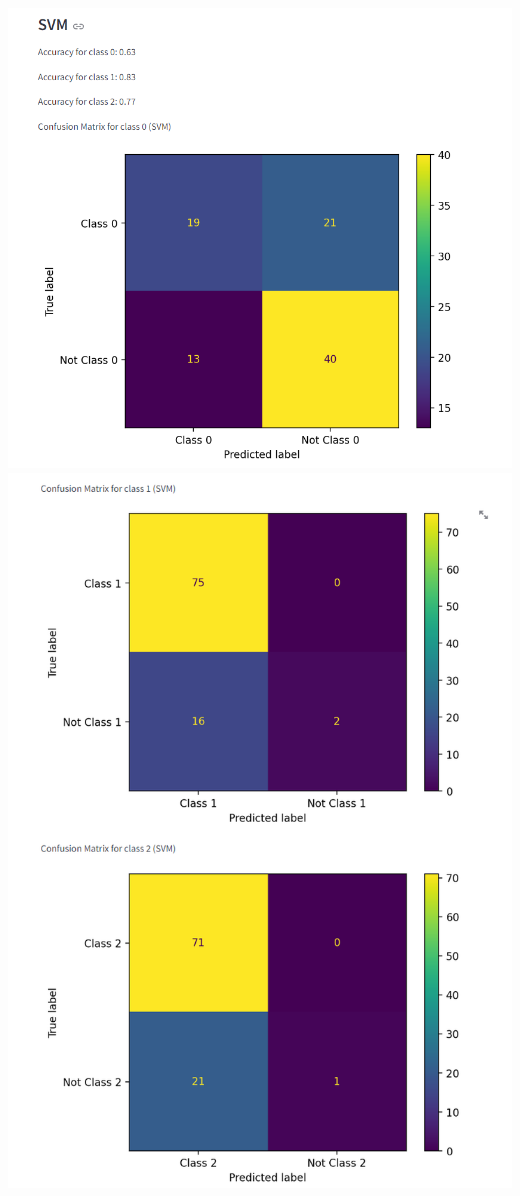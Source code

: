 \documentclass{article}
\begin{document}
\includegraphics[width=1.0\linewidth]{tab1_svm1.png}
\includegraphics[width=1.0\linewidth]{tab1_svm2.png}
\end{document}
